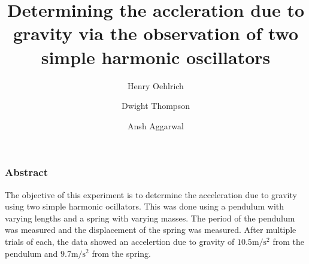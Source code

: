 \documentclass[10pt]{beamer}
\title{Determining the accleration due to gravity via the observation of two simple harmonic oscillators}
\author{Henry Oehlrich \and Dwight Thompson \and Ansh Aggarwal}
\begin{document}
\maketitle

\begin{frame}
    \frametitle{Abstract}
    The objective of this experiment is to determine the acceleration due to
    gravity using two simple harmonic ocillators. This was done using a
    pendulum with varying lengths and a spring with varying masses. The period
    of the pendulum was measured and the displacement of the spring was
    measured. After multiple trials of each, the data showed an accelertion due
    to gravity of $10.5\si{\meter\per\second\squared}$ from the pendulum and
    $9.7\si{\meter\per\second\squared}$ from the spring.
\end{frame}
\end{document}
